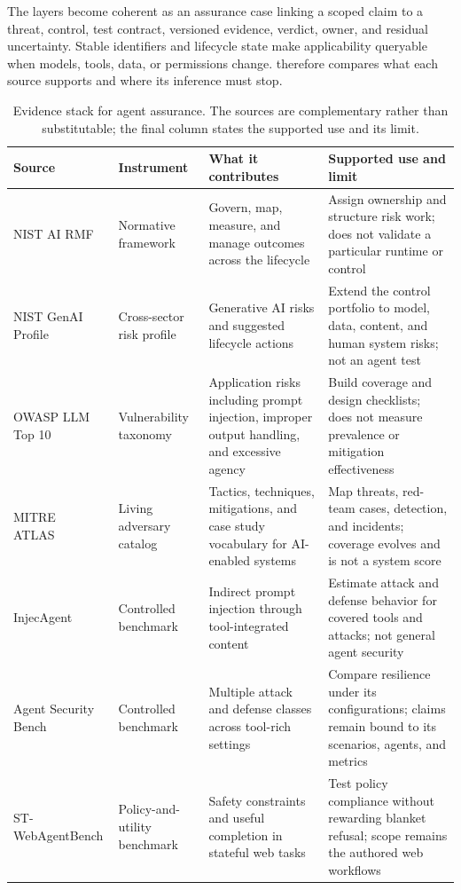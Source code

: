 The layers become coherent as an assurance case linking a scoped claim to a threat, control, test contract, versioned evidence, verdict, owner, and residual uncertainty. Stable identifiers and lifecycle state make applicability queryable when models, tools, data, or permissions change.  therefore compares what each source supports and where its inference must stop.

\begin{table}[H]
\centering
\caption{Evidence stack for agent assurance. The sources are complementary rather than substitutable; the final column states the supported use and its limit.}
\label{tab:safety-evidence}
\small
\surveytableformat
\begin{tabularx}{\textwidth}{L{2.8cm}L{2.5cm}L{4.15cm}Y}
\toprule
{}\textbf{Source} & \textbf{Instrument} & \textbf{What it contributes} & \textbf{Supported use and limit} \\
\midrule
NIST AI RMF~\cite{nist2023airmf} & Normative framework & Govern, map, measure, and manage outcomes across the lifecycle & Assign ownership and structure risk work; does not validate a particular runtime or control \\
NIST GenAI Profile~\cite{nist2024genaiprofile} & Cross-sector risk profile & Generative AI risks and suggested lifecycle actions & Extend the control portfolio to model, data, content, and human system risks; not an agent test \\
OWASP LLM Top 10~\cite{owasp2025llmtop10} & Vulnerability taxonomy & Application risks including prompt injection, improper output handling, and excessive agency & Build coverage and design checklists; does not measure prevalence or mitigation effectiveness \\
MITRE ATLAS~\cite{mitre2026atlas} & Living adversary catalog & Tactics, techniques, mitigations, and case study vocabulary for AI-enabled systems & Map threats, red-team cases, detection, and incidents; coverage evolves and is not a system score \\
InjecAgent~\cite{zhan2024injecagent} & Controlled benchmark & Indirect prompt injection through tool-integrated content & Estimate attack and defense behavior for covered tools and attacks; not general agent security \\
Agent Security Bench~\cite{zhang2024agentsecuritybench} & Controlled benchmark & Multiple attack and defense classes across tool-rich settings & Compare resilience under its configurations; claims remain bound to its scenarios, agents, and metrics \\
ST-WebAgent\-Bench\newline\cite{levy2026stwebagentbench} & Policy-and-utility benchmark & Safety constraints and useful completion in stateful web tasks & Test policy compliance without rewarding blanket refusal; scope remains the authored web workflows \\
\bottomrule
\end{tabularx}
\end{table}


